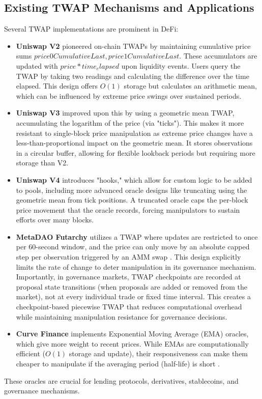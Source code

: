 \documentclass{article}
\begin{document}
\subsection{Existing TWAP Mechanisms and Applications}
Several TWAP implementations are prominent in DeFi:
\begin{itemize}
    \item \textbf{Uniswap V2} pioneered on-chain TWAPs by maintaining cumulative price sums $price0CumulativeLast, price1CumulativeLast$. These accumulators are updated with $price * time_elapsed$ upon liquidity events. Users query the TWAP by taking two readings and calculating the difference over the time elapsed. This design offers $O(1)$ storage but calculates an arithmetic mean, which can be influenced by extreme price swings over sustained periods.
    \item \textbf{Uniswap V3} improved upon this by using a geometric mean TWAP, accumulating the logarithm of the price (via "ticks"). This makes it more resistant to single-block price manipulation as extreme price changes have a less-than-proportional impact on the geometric mean. It stores observations in a circular buffer, allowing for flexible lookback periods but requiring more storage than V2.
    \item \textbf{Uniswap V4} introduces "hooks," which allow for custom logic to be added to pools, including more advanced oracle designs like truncating using the geometric mean from tick positions. A truncated oracle caps the per-block price movement that the oracle records, forcing manipulators to sustain efforts over many blocks.
    \item \textbf{MetaDAO Futarchy} utilizes a TWAP where updates are restricted to once per 60-second window, and the price can only move by an absolute capped step per observation triggered by an AMM swap \cite{ammrs}. This design explicitly limits the rate of change to deter manipulation in its governance mechanism. Importantly, in governance markets, TWAP checkpoints are recorded at proposal state transitions (when proposals are added or removed from the market), not at every individual trade or fixed time interval. This creates a checkpoint-based piecewise TWAP that reduces computational overhead while maintaining manipulation resistance for governance decisions.
    \item \textbf{Curve Finance} implements Exponential Moving Average (EMA) oracles, which give more weight to recent prices. While EMAs are computationally efficient ($O(1)$ storage and update), their responsiveness can make them cheaper to manipulate if the averaging period (half-life) is short \cite{curve_ema_blog}.
\end{itemize}
These oracles are crucial for lending protocols, derivatives, stablecoins, and governance mechanisms.
\end{document}
